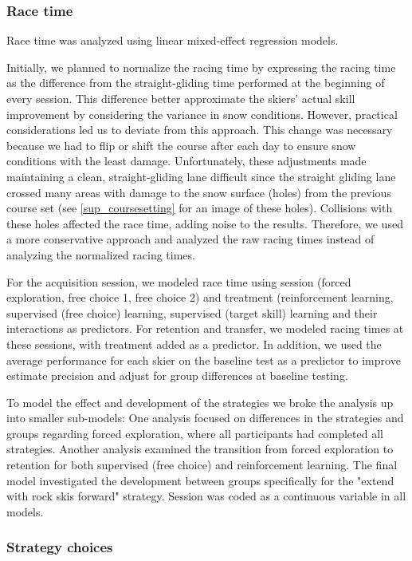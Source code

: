 \documentclass[pdflatex,sn-mathphys-num]{sn-jnl}%
\theoremstyle{thmstyleone}%
\theoremstyle{thmstyletwo}%
\theoremstyle{thmstylethree}%
\begin{document}
 \subsubsection{Race time}

Race time was analyzed using linear mixed-effect regression models. 

Initially, we planned to normalize the racing time by expressing the racing time as the difference from the straight-gliding time performed at the beginning of every session. This difference better approximate the skiers' actual skill improvement by considering the variance in snow conditions. However, practical considerations led us to deviate from this approach. This change was necessary because we had to flip or shift the course after each day to ensure snow conditions with the least damage. Unfortunately, these adjustments made maintaining a clean, straight-gliding lane difficult since the straight gliding lane crossed many areas with damage to the snow surface (holes) from the previous course set (see \ref{sup_coursesetting} for an image of these holes). Collisions with these holes affected the race time, adding noise to the results. Therefore, we used a more conservative approach and analyzed the raw racing times instead of analyzing the normalized racing times.

For the acquisition session, we modeled race time using session (forced exploration, free choice 1, free choice 2) and treatment (reinforcement learning, supervised (free choice) learning, supervised (target skill) learning and their interactions as predictors. For retention and transfer, we modeled racing times at these sessions, with treatment added as a predictor. In addition, we used the average performance for each skier on the baseline test as a predictor to improve estimate precision and adjust for group differences at baseline testing. 

To model the effect and development of the strategies we broke the analysis up into smaller sub-models: One analysis focused on differences in the strategies and groups regarding forced exploration, where all participants had completed all strategies. Another analysis examined the transition from forced exploration to retention for both supervised (free choice) and reinforcement learning. The final model investigated the development between groups specifically for the "extend with rock skis forward" strategy. Session was coded as a continuous variable in all models. 


\subsubsection{Strategy choices}
\end{document}
